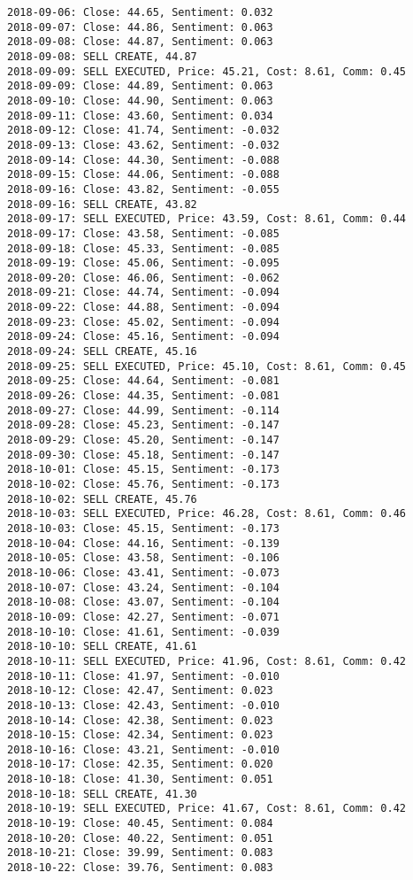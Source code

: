 \documentclass[11pt]{article}
\begin{document}
\begin{Verbatim}[commandchars=\\\{\}]
2018-09-06: Close: 44.65, Sentiment: 0.032
2018-09-07: Close: 44.86, Sentiment: 0.063
2018-09-08: Close: 44.87, Sentiment: 0.063
2018-09-08: SELL CREATE, 44.87
2018-09-09: SELL EXECUTED, Price: 45.21, Cost: 8.61, Comm: 0.45
2018-09-09: Close: 44.89, Sentiment: 0.063
2018-09-10: Close: 44.90, Sentiment: 0.063
2018-09-11: Close: 43.60, Sentiment: 0.034
2018-09-12: Close: 41.74, Sentiment: -0.032
2018-09-13: Close: 43.62, Sentiment: -0.032
2018-09-14: Close: 44.30, Sentiment: -0.088
2018-09-15: Close: 44.06, Sentiment: -0.088
2018-09-16: Close: 43.82, Sentiment: -0.055
2018-09-16: SELL CREATE, 43.82
2018-09-17: SELL EXECUTED, Price: 43.59, Cost: 8.61, Comm: 0.44
2018-09-17: Close: 43.58, Sentiment: -0.085
2018-09-18: Close: 45.33, Sentiment: -0.085
2018-09-19: Close: 45.06, Sentiment: -0.095
2018-09-20: Close: 46.06, Sentiment: -0.062
2018-09-21: Close: 44.74, Sentiment: -0.094
2018-09-22: Close: 44.88, Sentiment: -0.094
2018-09-23: Close: 45.02, Sentiment: -0.094
2018-09-24: Close: 45.16, Sentiment: -0.094
2018-09-24: SELL CREATE, 45.16
2018-09-25: SELL EXECUTED, Price: 45.10, Cost: 8.61, Comm: 0.45
2018-09-25: Close: 44.64, Sentiment: -0.081
2018-09-26: Close: 44.35, Sentiment: -0.081
2018-09-27: Close: 44.99, Sentiment: -0.114
2018-09-28: Close: 45.23, Sentiment: -0.147
2018-09-29: Close: 45.20, Sentiment: -0.147
2018-09-30: Close: 45.18, Sentiment: -0.147
2018-10-01: Close: 45.15, Sentiment: -0.173
2018-10-02: Close: 45.76, Sentiment: -0.173
2018-10-02: SELL CREATE, 45.76
2018-10-03: SELL EXECUTED, Price: 46.28, Cost: 8.61, Comm: 0.46
2018-10-03: Close: 45.15, Sentiment: -0.173
2018-10-04: Close: 44.16, Sentiment: -0.139
2018-10-05: Close: 43.58, Sentiment: -0.106
2018-10-06: Close: 43.41, Sentiment: -0.073
2018-10-07: Close: 43.24, Sentiment: -0.104
2018-10-08: Close: 43.07, Sentiment: -0.104
2018-10-09: Close: 42.27, Sentiment: -0.071
2018-10-10: Close: 41.61, Sentiment: -0.039
2018-10-10: SELL CREATE, 41.61
2018-10-11: SELL EXECUTED, Price: 41.96, Cost: 8.61, Comm: 0.42
2018-10-11: Close: 41.97, Sentiment: -0.010
2018-10-12: Close: 42.47, Sentiment: 0.023
2018-10-13: Close: 42.43, Sentiment: -0.010
2018-10-14: Close: 42.38, Sentiment: 0.023
2018-10-15: Close: 42.34, Sentiment: 0.023
2018-10-16: Close: 43.21, Sentiment: -0.010
2018-10-17: Close: 42.35, Sentiment: 0.020
2018-10-18: Close: 41.30, Sentiment: 0.051
2018-10-18: SELL CREATE, 41.30
2018-10-19: SELL EXECUTED, Price: 41.67, Cost: 8.61, Comm: 0.42
2018-10-19: Close: 40.45, Sentiment: 0.084
2018-10-20: Close: 40.22, Sentiment: 0.051
2018-10-21: Close: 39.99, Sentiment: 0.083
2018-10-22: Close: 39.76, Sentiment: 0.083

\end{Verbatim}
\end{document}
